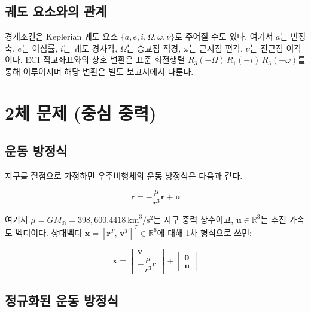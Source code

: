 \documentclass[11pt]{article}
\begin{document}
\subsection{궤도 요소와의 관계}

경계조건은 Keplerian 궤도 요소 $\{a, e, i, \Omega, \omega, \nu\}$로 주어질 수도 있다.
여기서 $a$는 반장축, $e$는 이심률, $i$는 궤도 경사각,
$\Omega$는 승교점 적경, $\omega$는 근지점 편각, $\nu$는 진근점 이각이다.
ECI 직교좌표와의 상호 변환은 표준 회전행렬 $R_3(-\Omega)\,R_1(-i)\,R_3(-\omega)$를 통해
이루어지며 해당 변환은 별도 보고서에서 다룬다.

\section{2체 문제 (중심 중력)}

\subsection{운동 방정식}

지구를 질점으로 가정하면 우주비행체의 운동 방정식은 다음과 같다.

\begin{equation}
  \ddot{\mathbf{r}} = -\frac{\mu}{r^3}\mathbf{r} + \mathbf{u}
  \label{eq:twobody}
\end{equation}

여기서 $\mu = GM_\oplus = 398{,}600.4418\ \mathrm{km}^3/\mathrm{s}^2$는 지구 중력 상수이고,
$\mathbf{u} \in \mathbb{R}^3$는 추진 가속도 벡터이다.
상태벡터 $\mathbf{x} = [\mathbf{r}^T,\, \mathbf{v}^T]^T \in \mathbb{R}^6$에 대해
1차 형식으로 쓰면:

\begin{equation}
  \dot{\mathbf{x}} =
  \begin{bmatrix} \mathbf{v} \\ -\dfrac{\mu}{r^3}\mathbf{r} \end{bmatrix}
  + \begin{bmatrix} \mathbf{0} \\ \mathbf{u} \end{bmatrix}
  \label{eq:state_eq}
\end{equation}

\subsection{정규화된 운동 방정식}
\end{document}
